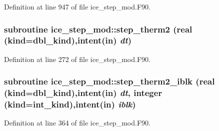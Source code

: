 Definition at line 947 of file ice\_\-step\_\-mod.F90.\hypertarget{namespaceice__step__mod_a4f84e9d5e596f23acbbe44ac3b9fdf25}{
\subsubsection[{step\_\-therm2}]{\setlength{\rightskip}{0pt plus 5cm}subroutine ice\_\-step\_\-mod::step\_\-therm2 (real (kind=dbl\_\-kind),intent(in) {\em dt})}}
\label{namespaceice__step__mod_a4f84e9d5e596f23acbbe44ac3b9fdf25}


Definition at line 272 of file ice\_\-step\_\-mod.F90.\hypertarget{namespaceice__step__mod_a81aa72f95f97b932fe2cd47da7c53755}{
\subsubsection[{step\_\-therm2\_\-iblk}]{\setlength{\rightskip}{0pt plus 5cm}subroutine ice\_\-step\_\-mod::step\_\-therm2\_\-iblk (real (kind=dbl\_\-kind),intent(in) {\em dt}, \/  integer (kind=int\_\-kind),intent(in) {\em iblk})}}
\label{namespaceice__step__mod_a81aa72f95f97b932fe2cd47da7c53755}


Definition at line 364 of file ice\_\-step\_\-mod.F90.